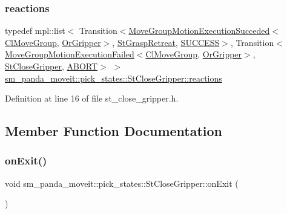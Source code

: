\subsubsection{\texorpdfstring{reactions}{reactions}}
{\footnotesize\ttfamily typedef mpl\+::list$<$ Transition$<$\hyperlink{structmoveit__z__client_1_1MoveGroupMotionExecutionSucceded}{Move\+Group\+Motion\+Execution\+Succeded}$<$\hyperlink{classmoveit__z__client_1_1ClMoveGroup}{Cl\+Move\+Group}, \hyperlink{classsm__panda__moveit_1_1OrGripper}{Or\+Gripper}$>$, \hyperlink{structsm__panda__moveit_1_1pick__states_1_1StGraspRetreat}{St\+Grasp\+Retreat}, \hyperlink{classSUCCESS}{S\+U\+C\+C\+E\+SS}$>$, Transition$<$\hyperlink{structmoveit__z__client_1_1MoveGroupMotionExecutionFailed}{Move\+Group\+Motion\+Execution\+Failed}$<$\hyperlink{classmoveit__z__client_1_1ClMoveGroup}{Cl\+Move\+Group}, \hyperlink{classsm__panda__moveit_1_1OrGripper}{Or\+Gripper}$>$, \hyperlink{structsm__panda__moveit_1_1pick__states_1_1StCloseGripper}{St\+Close\+Gripper}, \hyperlink{classABORT}{A\+B\+O\+RT}$>$ $>$ \hyperlink{structsm__panda__moveit_1_1pick__states_1_1StCloseGripper_af40cf0da3fc0139b082a1f892a616dc6}{sm\+\_\+panda\+\_\+moveit\+::pick\+\_\+states\+::\+St\+Close\+Gripper\+::reactions}}



Definition at line 16 of file st\+\_\+close\+\_\+gripper.\+h.



\subsection{Member Function Documentation}
\mbox{\label{structsm__panda__moveit_1_1pick__states_1_1StCloseGripper_a04d82ae62c8b796fc0347d51db585e03}} 
\subsubsection{\texorpdfstring{on\+Exit()}{onExit()}}
{\footnotesize\ttfamily void sm\+\_\+panda\+\_\+moveit\+::pick\+\_\+states\+::\+St\+Close\+Gripper\+::on\+Exit (\begin{DoxyParamCaption}{ }\end{DoxyParamCaption})\hspace{0.3cm}{\ttfamily [inline]}}



